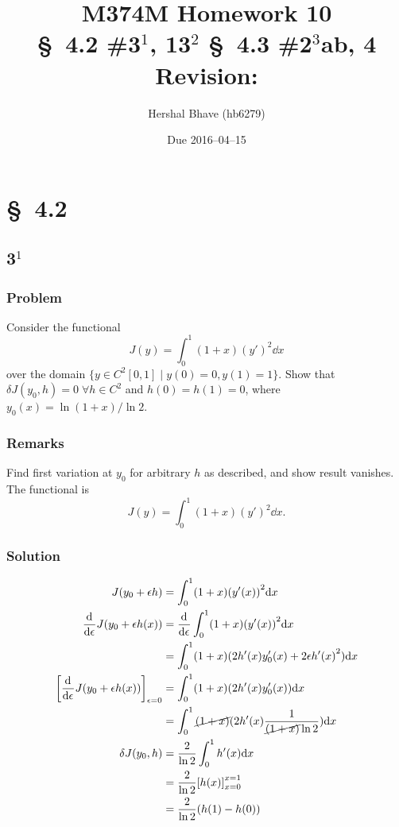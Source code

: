 \documentclass[12pt,twoside]{article}
\title{M374M Homework 10 \\
  \normalsize{\S~4.2 \#3$^1$, 13$^2$ \S~4.3 \#2$^3$ab, 4} \\
  Revision: }
\author{Hershal Bhave (hb6279)}
\date{Due 2016--04--15}
\begin{document}
\maketitle

\section{\S~4.2}
\subsection{3$^1$}
\subsubsection*{Problem}
Consider the functional
\begin{equation}
  \label{eq:4.2.3-problem}
  J(y)=\int_0^1(1+x){(y')}^2\dd{x}
\end{equation}
over the domain $\{y\in C^2[0,1]\;|\;y(0)=0,y(1)=1\}$. Show that $\delta
J(y_0,h)=0\;\forall h\in C^2$ and $h(0)=h(1)=0$, where $y_0(x)=\ln (1+x)/\ln2$.

\subsubsection*{Remarks}
Find first variation at $y_0$ for arbitrary $h$ as described, and show result
vanishes. The functional is $$J(y)=\int_0^1(1+x){(y')}^2\dd{x}.$$

\subsubsection*{Solution}
\begin{equation*}
  \begin{aligned}
    J(y_0+\epsilon h) &= \int_0^1(1+x){(y'(x))}^2\mathrm{d}{x} \\
    \frac{\mathrm{d}^{} {}}{\mathrm{d}{\epsilon}^{}} J(y_0+\epsilon h(x)) &= \frac{\mathrm{d}^{} {}}{\mathrm{d}{\epsilon}^{}} \int_0^1(1+x){(y'(x))}^2\mathrm{d}{x} \\
    &= \int_0^1 (1+x) (2h'(x)y_0'(x) + 2\epsilon {h'(x)}^2) \mathrm{d}{x} \\
    {\left[ \frac{\mathrm{d}^{} {}}{\mathrm{d}{\epsilon}^{}} J(y_0+\epsilon h(x)) \right]}_{\epsilon=0} &= \int_0^1 (1+x) (2h'(x)y_0'(x)) \mathrm{d}{x} \\
    &= \int_0^1 \cancel{(1+x)} (2h'(x)\frac{1}{\cancel{(1+x)}\ln2}) \mathrm{d}{x} \\
    \delta J(y_0,h) &= \frac{2}{\ln2}\int_0^1 h'(x) \mathrm{d}{x} \\
    &= \frac{2}{\ln2}{\left[ h(x) \right]}_{x=0}^{x=1} \\
    &= \frac{2}{\ln2}(h(1)-h(0)) \\
  \end{aligned}
\end{equation*}
\end{document}
